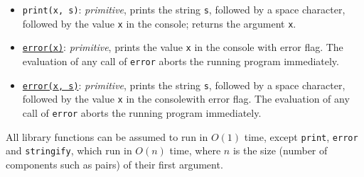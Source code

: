 \begin{itemize}
    \textit{primitive}, prints the value \texttt{x} in the
    console; returns the argument \texttt{a}.
  \item \texttt{print(x, s)}: \textit{primitive}, prints the
    string \texttt{s}, followed by a space character, followed by the
    value \texttt{x} in the console; returns the argument \texttt{x}.
  \item
    \href{https://sourceacademy.org/sicpjs/1.2.6\#footnote-7}{\texttt{error(x)}}:
    \textit{primitive}, prints the value \texttt{x} in the
    console with error flag. The evaluation of any call of
    \texttt{error} aborts the running program immediately.
  \item
    \href{https://sourceacademy.org/sicpjs/2.1.3\#footnote-2}{\texttt{error(x,
    s)}}: \textit{primitive}, prints the string \texttt{s},
    followed by a space character, followed by the value \texttt{x}
    in the console\footnotemark[\value{footnote}] with error flag.
    The evaluation
    of any call of \texttt{error} aborts the running program immediately.
\end{itemize}
All library functions can be assumed to run
in $O(1)$ time, except \texttt{print}, \texttt{error} and \texttt{stringify},
which run in $O(n)$ time, where $n$ is
the size (number of components such as pairs) of their first argument.
